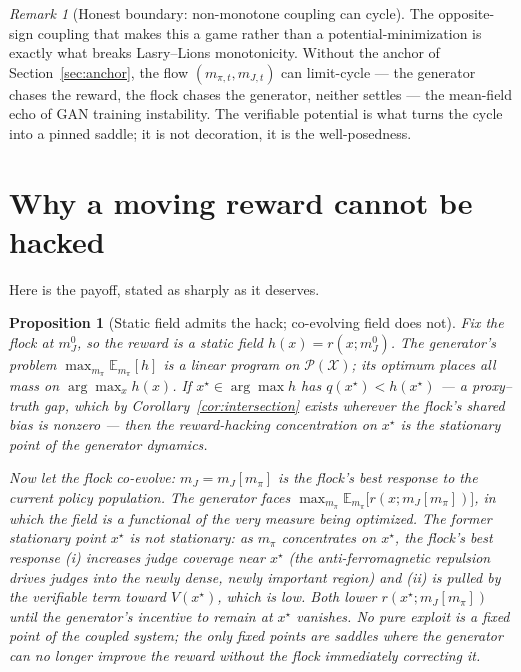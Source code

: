 \documentclass[11pt]{article}
\newtheorem{proposition}{Proposition}
\theoremstyle{definition}
\theoremstyle{remark}
\newtheorem{remark}{Remark}
\newcommand{\E}{\mathbb{E}}
\newcommand{\mpi}{m_{\pi}}
\newcommand{\mJ}{m_{J}}
\newcommand{\Prob}{\mathcal{P}}
\newcommand{\Xspace}{\mathcal{X}}
\begin{document}
\begin{remark}[Honest boundary: non-monotone coupling can cycle]
\label{rem:limitcycle}
The opposite-sign coupling that makes this a game rather than a potential-minimization is exactly what
breaks Lasry--Lions monotonicity. Without the anchor of Section~\ref{sec:anchor}, the flow
$(m_{\pi,t},m_{J,t})$ can limit-cycle --- the generator chases the reward, the flock chases the generator,
neither settles --- the mean-field echo of GAN training instability. The verifiable potential is what turns
the cycle into a pinned saddle; it is not decoration, it is the well-posedness.
\end{remark}

\section{Why a moving reward cannot be hacked}
\label{sec:saddle}

Here is the payoff, stated as sharply as it deserves.

\begin{proposition}[Static field admits the hack; co-evolving field does not]
\label{prop:hack}
Fix the flock at $\mJ^0$, so the reward is a static field $h(x)=r(x;\mJ^0)$. The generator's problem
$\max_{\mpi}\E_{\mpi}[h]$ is a linear program on $\Prob(\Xspace)$; its optimum places all mass on
$\arg\max_x h(x)$. If $x^\star\in\arg\max h$ has $q(x^\star)<h(x^\star)$ --- a proxy--truth gap, which by
Corollary~\ref{cor:intersection} exists wherever the flock's shared bias is nonzero --- then the reward-hacking
concentration on $x^\star$ is the \emph{stationary point} of the generator dynamics.

Now let the flock co-evolve: $\mJ=\mJ[\mpi]$ is the flock's best response to the current policy
population. The generator faces $\max_{\mpi}\E_{\mpi}\big[r(x;\mJ[\mpi])\big]$, in which the field is a
functional of the very measure being optimized. The former stationary point $x^\star$ is \emph{not}
stationary: as $\mpi$ concentrates on $x^\star$, the flock's best response (i) increases judge coverage
near $x^\star$ (the anti-ferromagnetic repulsion drives judges into the newly dense, newly important
region) and (ii) is pulled by the verifiable term toward $V(x^\star)$, which is low. Both lower
$r(x^\star;\mJ[\mpi])$ until the generator's incentive to remain at $x^\star$ vanishes. No pure exploit is
a fixed point of the coupled system; the only fixed points are saddles where the generator can no longer
improve the reward without the flock immediately correcting it.
\end{proposition}
\end{document}
